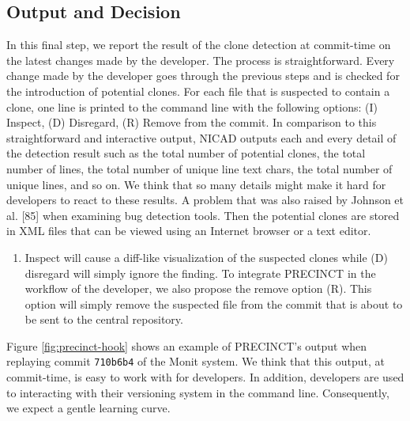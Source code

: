 \documentclass[12pt]{report}
\providecommand{\tightlist}{%
  \setlength{\itemsep}{0pt}\setlength{\parskip}{0pt}}
\begin{document}
\subsection{Output and Decision}\label{output-and-decision}

In this final step, we report the result of the clone detection at
commit-time on the latest changes made by the developer. The process is
straightforward. Every change made by the developer goes through the
previous steps and is checked for the introduction of potential clones.
For each file that is suspected to contain a clone, one line is printed
to the command line with the following options: (I) Inspect, (D)
Disregard, (R) Remove from the commit. In comparison to this
straightforward and interactive output, NICAD outputs each and every
detail of the detection result such as the total number of potential
clones, the total number of lines, the total number of unique line text
chars, the total number of unique lines, and so on. We think that so
many details might make it hard for developers to react to these
results. A problem that was also raised by Johnson et al. {[}85{]} when
examining bug detection tools. Then the potential clones are stored in
XML files that can be viewed using an Internet browser or a text editor.

\begin{enumerate}
\def\labelenumi{(\Roman{enumi})}
\tightlist
\item
  Inspect will cause a diff-like visualization of the suspected clones
  while (D) disregard will simply ignore the finding. To integrate
  PRECINCT in the workflow of the developer, we also propose the remove
  option (R). This option will simply remove the suspected file from the
  commit that is about to be sent to the central repository.
\end{enumerate}

Figure \ref{fig:precinct-hook} shows an example of PRECINCT's output
when replaying commit \lstinline!710b6b4! of the Monit system. We think
that this output, at commit-time, is easy to work with for developers.
In addition, developers are used to interacting with their versioning
system in the command line. Consequently, we expect a gentle learning
curve.
\end{document}
